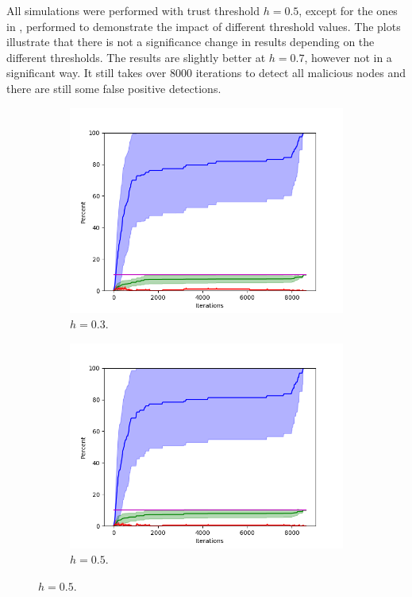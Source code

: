 \pagebreak
All simulations were performed with trust threshold $h=0.5$, except for the ones in , performed to demonstrate the impact of different threshold values.
The plots illustrate that there is not a significance change in results depending on the different thresholds.
The results are slightly better at $h=0.7$, however not in a significant way.
It still takes over 8000 iterations to detect all malicious nodes and there are still some false positive detections.

\begin{figure}

\begin{subfigure}{0.5\textwidth}
\includegraphics[width=\linewidth]{images/plots/thresholds/03_30_10}
\caption{$h = 0.3$.} \label{fig:threshold03}
\end{subfigure}
\hspace*{\fill} %
\begin{subfigure}{0.5\textwidth}
\includegraphics[width=\linewidth]{images/plots/thresholds/05_30_10}
\caption{$h = 0.5$.} \label{fig:threshold05}
\end{subfigure}


\end{figure}
